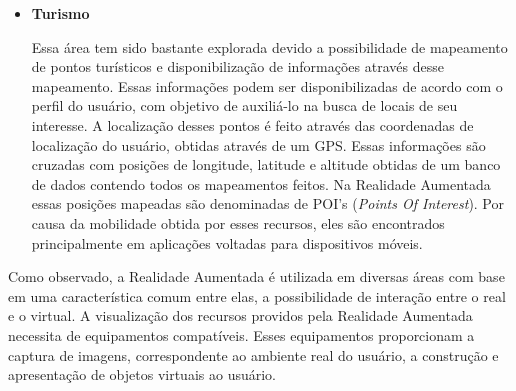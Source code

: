 \begin{itemize}
	
	  \item \textbf{Turismo} 
	  
	  		Essa área tem sido bastante explorada devido a possibilidade de mapeamento de pontos
	  		turísticos e disponibilização de informações através desse mapeamento. Essas informações podem
	  		ser disponibilizadas de acordo com o perfil do usuário, com objetivo de auxiliá-lo na busca de
	  		locais de seu interesse. A localização desses pontos é feito através das coordenadas de
	  		localização do usuário, obtidas através de um GPS. Essas informações são cruzadas com posições
	  		de longitude, latitude e altitude obtidas de um banco de dados contendo todos os mapeamentos
	  		feitos. Na Realidade Aumentada essas posições mapeadas são denominadas de POI's (\textit{Points Of
	  		Interest}). Por causa da mobilidade obtida por esses recursos, eles são encontrados
	  		principalmente em aplicações voltadas para dispositivos móveis.
	
	\end{itemize}
	
	
	Como observado, a Realidade Aumentada é utilizada em diversas áreas com base em uma característica
	comum entre elas, a possibilidade de interação entre o real e o virtual. A visualização dos recursos
	providos pela Realidade Aumentada necessita de equipamentos compatíveis. Esses equipamentos
	proporcionam a captura de imagens, correspondente ao ambiente real do usuário, a construção e
	apresentação de objetos virtuais ao usuário.
	
